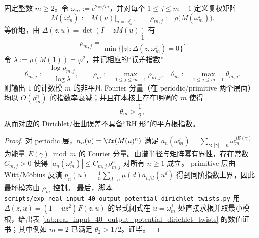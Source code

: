\begin{proposition}\label{prop:real-input-40-output-dirichlet-nonrh}
固定整数 \(m\ge 2\)。令 \(\omega_m:=e^{2\pi i/m}\)，并对每个 \(1\le j\le m-1\) 定义复权矩阵
\[
M(\omega_m^j):=M(u)\big|_{u=\omega_m^j},
\qquad
\rho_{m,j}:=\rho\!\bigl(M(\omega_m^j)\bigr).
\]
等价地，由 \(\Delta(z,u)=\det(I-zM(u))\) 有
\[
\rho_{m,j}=\frac{1}{\min\{|z|:\Delta(z,\omega_m^j)=0\}}.
\]
令 \(\lambda:=\rho(M(1))=\varphi^2\)，并记相应的“误差指数”
\[
\theta_{m,j}:=\frac{\log \rho_{m,j}}{\log \lambda},
\qquad
\rho_m:=\max_{1\le j\le m-1}\rho_{m,j},\quad
\theta_m:=\max_{1\le j\le m-1}\theta_{m,j}.
\]
则输出 \(1\) 的计数模 \(m\) 的非平凡 Fourier 分量（在 periodic/primitive 两个层面）均以 \(O(\rho_m^n)\) 的指数率衰减；并且在本核上存在明确的 \(m\) 使得
\[
\theta_m>\frac12,
\]
从而对应的 Dirichlet/扭曲误差不具备“RH 形”的平方根指数。
\end{proposition}
\begin{proof}
对 periodic 层，\(a_n(u)=\Tr(M(u)^n)\) 满足
\(
a_n(\omega_m^j)=\sum_{\gamma:\,|\gamma|=n}\omega_m^{jE(\gamma)}
\)
为能量 \(E(\gamma)\bmod m\) 的 Fourier 分量。由谱半径与矩阵幂有界性，存在常数 \(C_{m,j}>0\) 使得
\(
|a_n(\omega_m^j)|\le C_{m,j}\,\rho_{m,j}^n
\)
对所有 \(n\ge 1\) 成立。
primitive 层由 Witt/Möbius 反演
\(
p_n(u)=\frac1n\sum_{d\mid n}\mu(d)a_{n/d}(u^d)
\)
得到同阶指数上界，因此最坏模态由 \(\rho_m\) 控制。
最后，脚本 \texttt{scripts/exp\_real\_input\_40\_output\_potential\_dirichlet\_twists.py} 用 \(\Delta(z,u)=(1-uz^2)F(z,u)\) 的显式闭式在 \(u=\omega_m^j\) 处直接求根并取最小模根，给出表 \ref{tab:real_input_40_output_potential_dirichlet_twists} 的数值证书；其中例如 \(m=2\) 已满足 \(\theta_2>1/2\)。证毕。
\end{proof}




